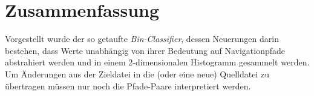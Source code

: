 \documentclass[a4paper,10pt]{article}
\begin{document}
\section{Zusammenfassung}
Vorgestellt wurde der so getaufte \textit{Bin-Classifier}, dessen Neuerungen darin bestehen, dass Werte unabhängig
von ihrer Bedeutung auf Navigationpfade abstrahiert werden und in einem 2-dimensionalen Histogramm gesammelt werden.
Um Änderungen aus der Zieldatei in die (oder eine neue) Quelldatei zu übertragen müssen nur noch die Pfade-Paare
interpretiert werden.


\printbibliography
\end{document}
